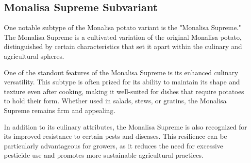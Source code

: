 \subsection{Monalisa Supreme Subvariant}
One notable subtype of the Monalisa potato variant is the "Monalisa Supreme." The Monalisa Supreme is a cultivated variation of the original Monalisa potato, distinguished by certain characteristics that set it apart within the culinary and agricultural spheres.

One of the standout features of the Monalisa Supreme is its enhanced culinary versatility. This subtype is often prized for its ability to maintain its shape and texture even after cooking, making it well-suited for dishes that require potatoes to hold their form. Whether used in salads, stews, or gratins, the Monalisa Supreme remains firm and appealing.

In addition to its culinary attributes, the Monalisa Supreme is also recognized for its improved resistance to certain pests and diseases. This resilience can be particularly advantageous for growers, as it reduces the need for excessive pesticide use and promotes more sustainable agricultural practices.

